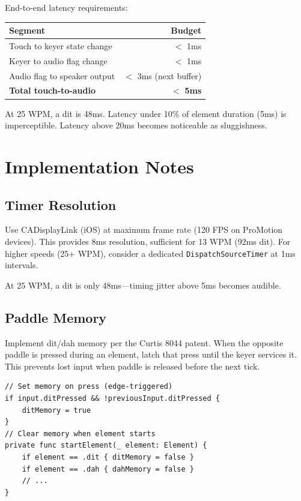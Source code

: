 \documentclass[a4paper,10pt,fleqn]{article}
\begin{document}
End-to-end latency requirements:

\begin{center}
\begin{tabular}{lr}
\hline
Segment & Budget \\
\hline
Touch to keyer state change & $<$ 1ms \\
Keyer to audio flag change & $<$ 1ms \\
Audio flag to speaker output & $<$ 3ms (next buffer) \\
\hline
\textbf{Total touch-to-audio} & $<$ \textbf{5ms} \\
\hline
\end{tabular}
\end{center}

At 25 WPM, a dit is 48ms. Latency under 10\% of element duration (5ms) is
imperceptible. Latency above 20ms becomes noticeable as sluggishness.

\section{Implementation Notes}

\subsection{Timer Resolution}

Use CADisplayLink (iOS) at maximum frame rate (120 FPS on ProMotion devices).
This provides 8ms resolution, sufficient for 13 WPM (92ms dit). For higher
speeds (25+ WPM), consider a dedicated \texttt{DispatchSourceTimer} at 1ms
intervals.

At 25 WPM, a dit is only 48ms---timing jitter above 5ms becomes audible.

\subsection{Paddle Memory}

Implement dit/dah memory per the Curtis 8044 patent. When the opposite paddle
is pressed during an element, latch that press until the keyer services it.
This prevents lost input when paddle is released before the next tick.

\begin{verbatim}
// Set memory on press (edge-triggered)
if input.ditPressed && !previousInput.ditPressed {
    ditMemory = true
}
// Clear memory when element starts
private func startElement(_ element: Element) {
    if element == .dit { ditMemory = false }
    if element == .dah { dahMemory = false }
    // ...
}
\end{verbatim}
\end{document}
